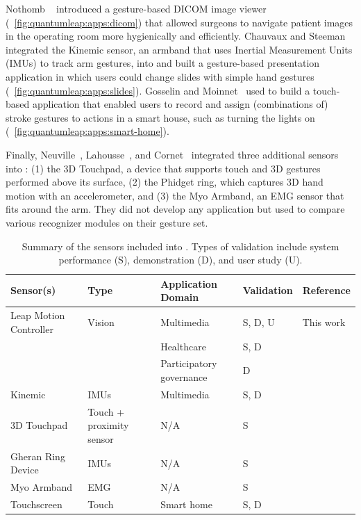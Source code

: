 Nothomb \etal~\cite{Nothomb:2020} introduced a gesture-based DICOM image viewer (\fig~\ref{fig:quantumleap:apps:dicom}) that allowed surgeons to navigate patient images in the operating room more hygienically and efficiently.
%
Chauvaux and Steeman~\cite{Steeman:2022} integrated the Kinemic sensor, an armband that uses Inertial Measurement Units (IMUs) to track arm gestures, into \ql and built a gesture-based presentation application in which users could change slides with simple hand gestures (\fig~\ref{fig:quantumleap:apps:slides}).
%
Gosselin and Moinnet~\cite{Moinnet:2022} used \ql to build a touch-based application that enabled users to record and assign (combinations of) stroke gestures to actions in a smart house, such as turning the lights on (\fig~\ref{fig:quantumleap:apps:smart-home}).

Finally, Neuville~\cite{Neuville:2021}, Lahousse~\cite{Lahousse:2022}, and Cornet~\cite{Cornet:2023} integrated three additional sensors into \ql: (1) the 3D Touchpad, a device that supports touch and 3D gestures performed above its surface, (2) the Phidget ring, which captures 3D hand motion with an accelerometer, and (3) the Myo Armband, an EMG sensor that fits around the arm. They did not develop any application but used \ql to compare various recognizer modules on their gesture set.

\begin{table}
    \renewcommand{\arraystretch}{1.2}
    \footnotesize
    \centering
    \begin{tabular}{l>{\raggedright}p{2.5cm}>{\raggedright}p{1.75cm}ll}
        \toprule    
        \textbf{Sensor(s)} & \textbf{Type} & \textbf{Application Domain} & \textbf{Validation} & \textbf{Reference} \\
        \midrule
        Leap Motion Controller & Vision & Multimedia & S, D, U & This work \\
         &  & Healthcare & S, D & \cite{Nothomb:2020} \\
         &  & Participatory governance & D & \cite{Rawart:2023} \\
        Kinemic & IMUs & Multimedia & S, D & \cite{Steeman:2022} \\
        3D Touchpad & Touch + proximity sensor & N/A & S & \cite{Neuville:2021} \\
        Gheran Ring Device & IMUs & N/A & S & \cite{Lahousse:2022} \\
        Myo Armband & EMG & N/A & S & \cite{Cornet:2023} \\
        Touchscreen & Touch & Smart home & S, D & \cite{Moinnet:2022} \\
        \bottomrule
    \end{tabular}
    \caption{Summary of the sensors included into \ql. Types of validation include system performance (S), demonstration (D), and user study (U).}
    \label{tab:quantumleap:integration}
\end{table}

